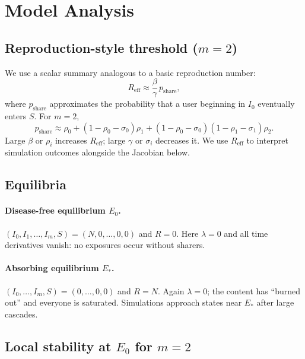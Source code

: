 \documentclass[11pt]{article}
\begin{document}
\section{Model Analysis}

\subsection{Reproduction-style threshold \texorpdfstring{($m=2$)}{(m = 2)}}

We use a scalar summary analogous to a basic reproduction number:
\begin{equation}
R_{\mathrm{eff}} \approx \frac{\beta}{\gamma}\,p_{\mathrm{share}},
\label{eq:Reff}
\end{equation}
where $p_{\mathrm{share}}$ approximates the probability that a user beginning in $I_0$ eventually enters $S$. For $m=2$,
\begin{equation}
p_{\mathrm{share}} \approx \rho_0 + (1-\rho_0-\sigma_0)\rho_1 + (1-\rho_0-\sigma_0)(1-\rho_1-\sigma_1)\rho_2.
\label{eq:pshare}
\end{equation}
Large $\beta$ or $\rho_i$ increases $R_{\mathrm{eff}}$; large $\gamma$ or $\sigma_i$ decreases it. We use $R_{\mathrm{eff}}$ to interpret simulation outcomes alongside the Jacobian below.

\subsection{Equilibria}

\paragraph{Disease-free equilibrium $E_0$.} $(I_0,I_1,\ldots,I_m,S)=(N,0,\ldots,0,0)$ and $R=0$. Here $\lambda=0$ and all time derivatives vanish: no exposures occur without sharers.

\paragraph{Absorbing equilibrium $E_\ast$.} $(I_0,\ldots,I_m,S)=(0,\ldots,0,0)$ and $R=N$. Again $\lambda=0$; the content has ``burned out'' and everyone is saturated. Simulations approach states near $E_\ast$ after large cascades.

\subsection{Local stability \texorpdfstring{at $E_0$ for $m=2$}{at E0 for m = 2}}
\end{document}
